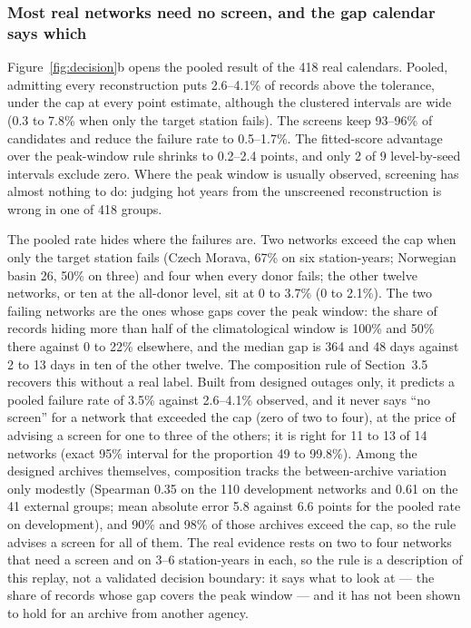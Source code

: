 \documentclass[draft]{agujournal2025}
\begin{document}
\subsubsection{Most real networks need no screen, and the gap calendar says which}

Figure~\ref{fig:decision}b opens the pooled result of the 418 real calendars. Pooled, admitting
every reconstruction puts 2.6--4.1\% of records above the tolerance, under the cap
at every point estimate, although the clustered intervals are wide (0.3 to 7.8\%
when only the target station fails). The screens keep 93--96\% of candidates and
reduce the failure rate to 0.5--1.7\%. The fitted-score advantage over the
peak-window rule shrinks to 0.2--2.4 points, and only 2 of 9 level-by-seed
intervals exclude zero. Where the peak window is usually observed, screening has
almost nothing to do: judging hot years from the unscreened reconstruction is
wrong in one of 418 groups.

The pooled rate hides where the failures are. Two networks exceed the cap when
only the target station fails (Czech Morava, 67\% on six station-years; Norwegian
basin 26, 50\% on three) and four when every donor fails; the other twelve
networks, or ten at the all-donor level, sit at 0 to 3.7\% (0 to 2.1\%). The two
failing networks are the ones whose gaps cover the peak window: the share of
records hiding more than half of the climatological window is 100\% and 50\%
there against 0 to 22\% elsewhere, and the median gap is 364 and 48 days against
2 to 13 days in ten of the other twelve. The composition rule of Section~3.5 recovers this
without a real label. Built from designed outages only, it predicts a pooled failure
rate of 3.5\% against 2.6--4.1\% observed, and it never says ``no screen'' for a
network that exceeded the cap (zero of two to four), at the price of advising a
screen for one to three of the others; it is right for 11 to 13 of 14 networks
(exact 95\% interval for the proportion 49 to 99.8\%). Among the designed
archives themselves, composition tracks the between-archive variation only
modestly (Spearman 0.35 on the 110 development networks and 0.61 on the 41
external groups; mean absolute error 5.8 against 6.6 points for the pooled rate
on development), and 90\% and 98\% of those archives exceed the cap, so the rule
advises a screen for all of them. The real evidence rests on two to four
networks that need a screen and on 3--6 station-years in each, so the rule is a
description of this replay, not a validated decision boundary: it says what to
look at --- the share of records whose gap covers the peak window --- and it has
not been shown to hold for an archive from another agency.
\end{document}
